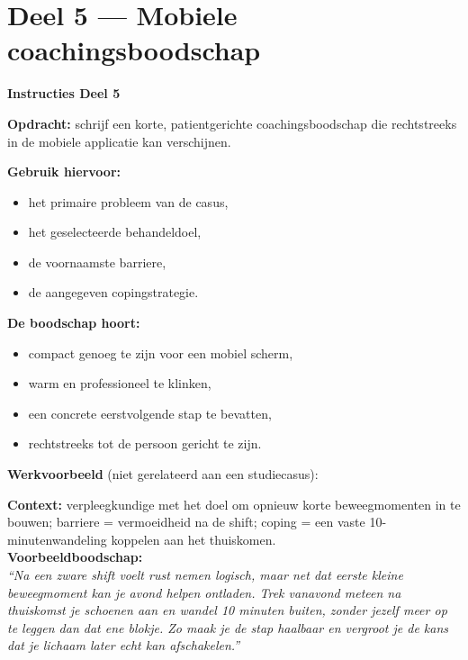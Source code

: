 \documentclass[11pt,a4paper]{article}
\begin{document}
\vspace{0.6em}
\newpage


\section{Deel 5 --- Mobiele coachingsboodschap}

\begin{tcolorbox}[colback=red!3,colframe=ForestGreen,arc=2.5mm,boxrule=0.9pt,
  left=10pt,right=10pt,top=9pt,bottom=9pt]
\textbf{\color{ForestGreen}Instructies Deel 5}

\smallskip\small
\textbf{Opdracht:} schrijf een korte, patientgerichte coachingsboodschap die rechtstreeks in de
mobiele applicatie kan verschijnen.

\textbf{Gebruik hiervoor:}
\begin{itemize}[topsep=2pt,itemsep=2pt]
\item het primaire probleem van de casus,
\item het geselecteerde behandeldoel,
\item de voornaamste barriere,
\item de aangegeven copingstrategie.
\end{itemize}

\textbf{De boodschap hoort:}
\begin{itemize}[topsep=2pt,itemsep=2pt]
\item compact genoeg te zijn voor een mobiel scherm,
\item warm en professioneel te klinken,
\item een concrete eerstvolgende stap te bevatten,
\item rechtstreeks tot de persoon gericht te zijn.
\end{itemize}

\textbf{Werkvoorbeeld} (niet gerelateerd aan een studiecasus):
\begin{tcolorbox}[colback=SoftBG,colframe=BorderGrey,boxrule=0.4pt,arc=1.5mm,
  left=7pt,right=7pt,top=5pt,bottom=5pt]
\small
\textbf{Context:} verpleegkundige met het doel om opnieuw korte beweegmomenten in te bouwen;
barriere = vermoeidheid na de shift; coping = een vaste 10-minutenwandeling koppelen aan het thuiskomen.\\[0.3em]
\textbf{Voorbeeldboodschap:}\\
\textit{``Na een zware shift voelt rust nemen logisch, maar net dat eerste kleine beweegmoment kan je avond helpen ontladen. Trek vanavond meteen na thuiskomst je schoenen aan en wandel 10 minuten buiten, zonder jezelf meer op te leggen dan dat ene blokje. Zo maak je de stap haalbaar en vergroot je de kans dat je lichaam later echt kan afschakelen.''}
\end{tcolorbox}
\end{tcolorbox}
\end{document}
